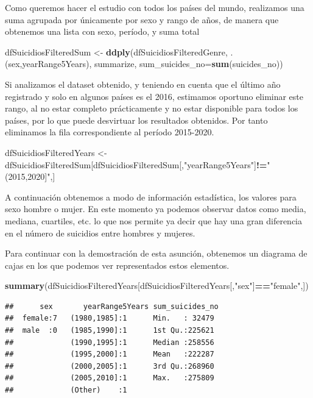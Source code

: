 \documentclass[]{article}
\newenvironment{Shaded}{\begin{snugshade}}{\end{snugshade}}
\newcommand{\DataTypeTok}[1]{\textcolor[rgb]{0.13,0.29,0.53}{#1}}
\newcommand{\KeywordTok}[1]{\textcolor[rgb]{0.13,0.29,0.53}{\textbf{#1}}}
\newcommand{\NormalTok}[1]{#1}
\newcommand{\OperatorTok}[1]{\textcolor[rgb]{0.81,0.36,0.00}{\textbf{#1}}}
\newcommand{\StringTok}[1]{\textcolor[rgb]{0.31,0.60,0.02}{#1}}
\begin{document}
Como queremos hacer el estudio con todos los países del mundo,
realizamos una suma agrupada por únicamente por sexo y rango de años, de
manera que obtenemos una lista con sexo, período, y suma total

\begin{Shaded}
\begin{Highlighting}[]
\NormalTok{dfSuicidiosFilteredSum <-}\StringTok{ }\KeywordTok{ddply}\NormalTok{(dfSuicidiosFilteredGenre, .(sex,yearRange5Years), summarize,  }\DataTypeTok{sum_suicides_no=}\KeywordTok{sum}\NormalTok{(suicides_no))}
\end{Highlighting}
\end{Shaded}

Si analizamos el dataset obtenido, y teniendo en cuenta que el último
año registrado y solo en algunos países es el 2016, estimamos oportuno
eliminar este rango, al no estar completo prácticamente y no estar
disponible para todos los países, por lo que puede desvirtuar los
resultados obtenidos. Por tanto eliminamos la ﬁla correspondiente al
período 2015-2020.

\begin{Shaded}
\begin{Highlighting}[]
\NormalTok{dfSuicidiosFilteredYears <-}\StringTok{ }\NormalTok{dfSuicidiosFilteredSum[dfSuicidiosFilteredSum[,}\StringTok{"yearRange5Years"}\NormalTok{]}\OperatorTok{!=}\StringTok{"(2015,2020]"}\NormalTok{,]}
\end{Highlighting}
\end{Shaded}

A continuación obtenemos a modo de información estadística, los valores
para sexo hombre o mujer. En este momento ya podemos observar datos como
media, mediana, cuartiles, etc. lo que nos permite ya decir que hay una
gran diferencia en el número de suicidios entre hombres y mujeres.

Para continuar con la demostración de esta asunción, obtenemos un
diagrama de cajas en los que podemos ver representados estos elementos.

\begin{Shaded}
\begin{Highlighting}[]
\KeywordTok{summary}\NormalTok{(dfSuicidiosFilteredYears[dfSuicidiosFilteredYears[,}\StringTok{"sex"}\NormalTok{]}\OperatorTok{==}\StringTok{"female"}\NormalTok{,])}
\end{Highlighting}
\end{Shaded}

\begin{verbatim}
##      sex       yearRange5Years sum_suicides_no 
##  female:7   (1980,1985]:1      Min.   : 32479  
##  male  :0   (1985,1990]:1      1st Qu.:225621  
##             (1990,1995]:1      Median :258556  
##             (1995,2000]:1      Mean   :222287  
##             (2000,2005]:1      3rd Qu.:268960  
##             (2005,2010]:1      Max.   :275809  
##             (Other)    :1
\end{verbatim}
\end{document}
